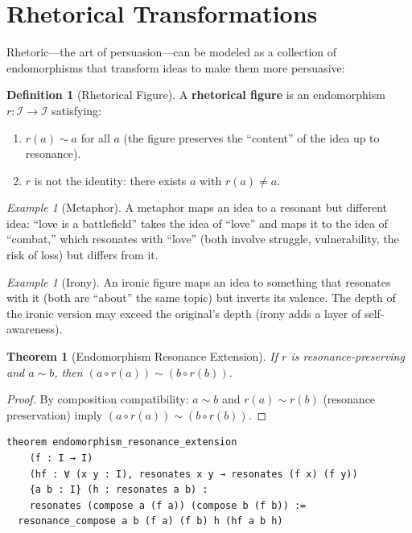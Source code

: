 \documentclass[11pt,openany]{book}
\theoremstyle{definition}
\newtheorem{definition}[axiom]{Definition}
\theoremstyle{plain}
\newtheorem{theorem}[axiom]{Theorem}
\theoremstyle{remark}
\newtheorem{example}[axiom]{Example}
\newcommand{\IS}{\mathcal{I}}               %
\newcommand{\compose}{\circ}                 %
\newcommand{\res}{\sim}                      %
\begin{document}
\section{Rhetorical Transformations}

Rhetoric---the art of persuasion---can be modeled as a collection of endomorphisms that transform ideas to make them more persuasive:

\begin{definition}[Rhetorical Figure]
A \textbf{rhetorical figure} is an endomorphism $r : \IS \to \IS$ satisfying:
\begin{enumerate}
\item $r(a) \res a$ for all $a$ (the figure preserves the ``content'' of the idea up to resonance).
\item $r$ is not the identity: there exists $a$ with $r(a) \neq a$.
\end{enumerate}
\end{definition}

\begin{example}[Metaphor]
A metaphor maps an idea to a resonant but different idea: ``love is a battlefield'' takes the idea of ``love'' and maps it to the idea of ``combat,'' which resonates with ``love'' (both involve struggle, vulnerability, the risk of loss) but differs from it.
\end{example}

\begin{example}[Irony]
An ironic figure maps an idea to something that resonates with it (both are ``about'' the same topic) but inverts its valence. The depth of the ironic version may exceed the original's depth (irony adds a layer of self-awareness).
\end{example}

\begin{theorem}[Endomorphism Resonance Extension]
If $r$ is resonance-preserving and $a \res b$, then $(a \compose r(a)) \res (b \compose r(b))$.
\end{theorem}

\begin{proof}
By composition compatibility: $a \res b$ and $r(a) \res r(b)$ (resonance preservation) imply $(a \compose r(a)) \res (b \compose r(b))$.
\end{proof}

\begin{lstlisting}
theorem endomorphism_resonance_extension
    (f : I → I)
    (hf : ∀ (x y : I), resonates x y → resonates (f x) (f y))
    {a b : I} (h : resonates a b) :
    resonates (compose a (f a)) (compose b (f b)) :=
  resonance_compose a b (f a) (f b) h (hf a b h)
\end{lstlisting}
\end{document}
